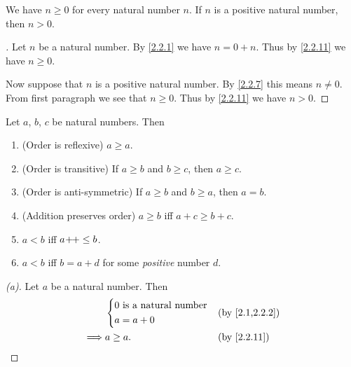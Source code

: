 \begin{ac}\label{ac:2.2.4}
  We have \(n \geq 0\) for every natural number \(n\).
  If \(n\) is a positive natural number, then \(n > 0\).
\end{ac}

\begin{proof}[]
  Let \(n\) be a natural number.
  By \cref{2.2.1} we have \(n = 0 + n\).
  Thus by \cref{2.2.11} we have \(n \geq 0\).

  Now suppose that \(n\) is a positive natural number.
  By \cref{2.2.7} this means \(n \neq 0\).
  From first paragraph we see that \(n \geq 0\).
  Thus by \cref{2.2.11} we have \(n > 0\).
\end{proof}

\begin{prop}\label{2.2.12}
  Let \(a\), \(b\), \(c\) be natural numbers.
  Then
  \begin{enumerate}
    \item (Order is reflexive) \(a \geq a\).
    \item (Order is transitive) If \(a \geq b\) and \(b \geq c\), then \(a \geq c\).
    \item (Order is anti-symmetric) If \(a \geq b\) and \(b \geq a\), then \(a = b\).
    \item (Addition preserves order) \(a \geq b\) iff \(a + c \geq b + c\).
    \item \(a < b\) iff \(a\!+\!\!+ \leq b\).
    \item \(a < b\) iff \(b = a + d\) for some \emph{positive} number \(d\).
  \end{enumerate}
\end{prop}

\begin{proof}[(a)]
  Let \(a\) be a natural number.
  Then
  \begin{align*}
             & \begin{dcases}
                 0 \text{ is a natural number} \\
                 a = a + 0
               \end{dcases} &  & \by{2.1,2.2.2}                  \\
    \implies & a \geq a.                        &  & \by{2.2.11}
  \end{align*}
\end{proof}

